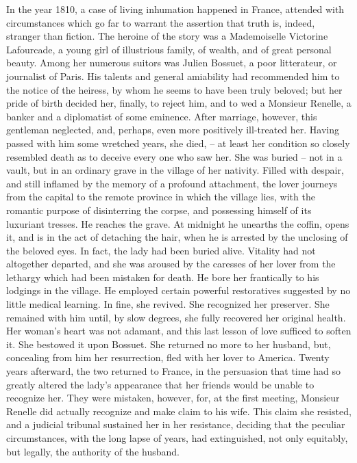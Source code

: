\documentclass[12pt,a4paper]{article}
\begin{document}
In the year 1810, a case of living inhumation happened in France, attended with circumstances which go far to warrant the assertion that truth is, indeed, stranger than fiction. The heroine of the story was a Mademoiselle Victorine Lafourcade, a young girl of illustrious family, of wealth, and of great personal beauty. Among her numerous suitors was Julien Bossuet, a poor litterateur, or journalist of Paris. His talents and general amiability had recommended him to the notice of the heiress, by whom he seems to have been truly beloved; but her pride of birth decided her, finally, to reject him, and to wed a Monsieur Renelle, a banker and a diplomatist of some eminence. After marriage, however, this gentleman neglected, and, perhaps, even more positively ill-treated her. Having passed with him some wretched years, she died, -- at least her condition so closely resembled death as to deceive every one who saw her. She was buried -- not in a vault, but in an ordinary grave in the village of her nativity. Filled with despair, and still inflamed by the memory of a profound attachment, the lover journeys from the capital to the remote province in which the village lies, with the romantic purpose of disinterring the corpse, and possessing himself of its luxuriant tresses. He reaches the grave. At midnight he unearths the coffin, opens it, and is in the act of detaching the hair, when he is arrested by the unclosing of the beloved eyes. In fact, the lady had been buried alive. Vitality had not altogether departed, and she was aroused by the caresses of her lover from the lethargy which had been mistaken for death. He bore her frantically to his lodgings in the village. He employed certain powerful restoratives suggested by no little medical learning. In fine, she revived. She recognized her preserver. She remained with him until, by slow degrees, she fully recovered her original health. Her woman's heart was not adamant, and this last lesson of love sufficed to soften it. She bestowed it upon Bossuet. She returned no more to her husband, but, concealing from him her resurrection, fled with her lover to America. Twenty years afterward, the two returned to France, in the persuasion that time had so greatly altered the lady's appearance that her friends would be unable to recognize her. They were mistaken, however, for, at the first meeting, Monsieur Renelle did actually recognize and make claim to his wife. This claim she resisted, and a judicial tribunal sustained her in her resistance, deciding that the peculiar circumstances, with the long lapse of years, had extinguished, not only equitably, but legally, the authority of the husband. \\
\end{document}
